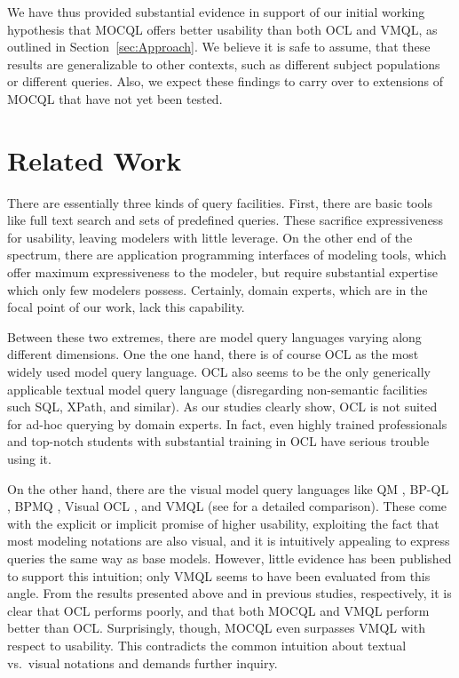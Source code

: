 \documentclass{llncs}
\newcommand{\MMQ}{MOCQL\xspace}
\begin{document}
We have thus provided substantial evidence in support of our initial working hypothesis that \MMQ offers better usability than both OCL and VMQL, as outlined in Section~\ref{sec:Approach}. We believe it is safe to assume, that these results are generalizable to other contexts, such as different subject populations or different queries. Also, we expect these findings to carry over to extensions of \MMQ that have not yet been tested.


\section{Related Work}\label{sec:relatedWork}

There are essentially three kinds of query facilities. First, there are basic tools like full text search and sets of predefined queries. These sacrifice expressiveness for usability, leaving modelers with little leverage. On the other end of the spectrum, there are application programming interfaces of modeling tools, which offer maximum expressiveness to the modeler, but require substantial expertise which only few modelers possess. Certainly, domain experts, which are in the focal point of our work, lack this capability.

Between these two extremes, there are model query languages varying along different dimensions.
One the one hand, there is of course OCL \cite{ocl231} as the most widely used model query language. OCL also seems to be the only generically applicable textual model query language (disregarding non-semantic facilities such SQL, XPath, and similar). As our studies clearly show, OCL is not suited for ad-hoc querying by domain experts. In fact, even highly trained professionals and top-notch students with substantial training in OCL have serious trouble using it.

On the other hand, there are the visual model query languages like QM \cite{stein:etal:query,stein:etal:graphical:lncs}, BP-QL \cite{Beeri:etal:2006:bpql}, BPMQ \cite{awad:etal:2008:bpmq,awad:diss}, Visual OCL \cite{bottoni:etal:consistency,bottoni:etal:visualisation}, and VMQL \cite{stoerrle:mq3:vlhcc09,stoerrle:mq3b:jvlc,stoerrle:mq4b:expressing:vlhcc} (see \cite{stoerrle:mq3b:jvlc} for a detailed comparison). These come with the explicit or implicit promise of higher usability, exploiting the fact that most modeling notations are also visual, and it is intuitively appealing to express queries the same way as base models. However, little evidence has been published to support this intuition; only VMQL seems to have been evaluated from this angle. From the results presented above and in previous studies, respectively, it is clear that OCL performs poorly, and that both \MMQ and VMQL perform better than OCL. Surprisingly, though, \MMQ even surpasses VMQL with respect to usability. This contradicts the common intuition about textual vs.\ visual notations and demands further inquiry.
\end{document}
